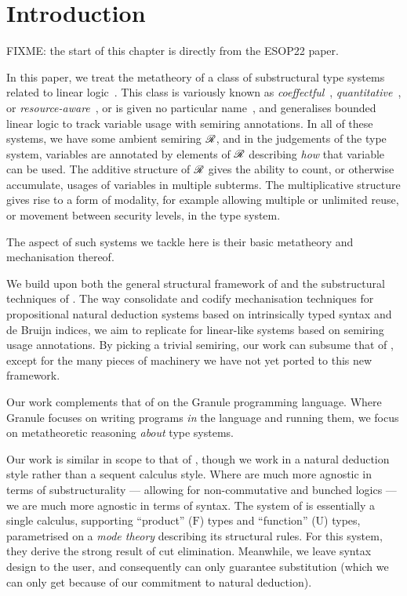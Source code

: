 \chapter{Introduction}

FIXME: the start of this chapter is directly from the ESOP22 paper.

In this paper, we treat the metatheory of a class of substructural type
systems related to linear logic~\cite{girard87linear}.
This class is variously known as
\emph{coeffectful}~\cite{PetricekOM14,Granule18},
\emph{quantitative}~\cite{BrunelGMZ14,Atkey18}, or
\emph{resource-aware}~\cite{GhicaS14},
or is given no particular name~\cite{reed10distance,abadi99core},
and generalises bounded linear logic to track variable usage with semiring
annotations.
In all of these systems, we have some ambient semiring $\mathscr R$, and in the
judgements of the type system, variables are annotated by elements of $\mathscr R$
describing \emph{how} that variable can be used.
The additive structure of $\mathscr R$ gives the ability to count, or otherwise
accumulate, usages of variables in multiple subterms.
The multiplicative structure gives rise to a form of modality, for example
allowing multiple or unlimited reuse, or movement between security levels, in
the type system.

The aspect of such systems we tackle here is their basic metatheory and
mechanisation thereof.

We build upon both the general structural framework of
\citet{AACMM21} and the substructural techniques of \citet{WA21}.
The way \citeauthor{AACMM21} consolidate and codify mechanisation techniques for
propositional natural deduction systems based on intrinsically typed syntax and
de Bruijn indices, we aim to replicate for linear-like systems based on
semiring usage annotations.
By picking a trivial semiring, our work can subsume that of
\citeauthor{AACMM21}, except for the many pieces of machinery we have not yet
ported to this new framework.

Our work complements that of \citet{Granule18} on the Granule programming
language.
Where Granule focuses on writing programs \emph{in} the language and running
them, we focus on metatheoretic reasoning \emph{about} type systems.

Our work is similar in scope to that of \citet{LicataSR17}, though we work in
a natural deduction style rather than a sequent calculus style.
Where \citeauthor{LicataSR17} are much more agnostic in terms of
substructurality --- allowing for non-commutative and bunched logics ---
we are much more agnostic in terms of syntax.
The system of \citeauthor{LicataSR17} is essentially a single calculus,
supporting ``product'' ($\mathrm F$) types and ``function'' ($\mathrm U$)
types, parametrised on a \emph{mode theory} describing its structural rules.
For this system, they derive the strong result of cut elimination.
Meanwhile, we leave syntax design to the user, and consequently can only
guarantee substitution (which we can only get because of our commitment to
natural deduction).

